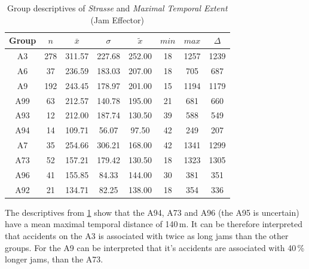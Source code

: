 \begin{table}[ht]
	\tiny
	\centering
	\begin{tabular}{c|c|c|c|c|c|c|c}
		\toprule
		Group & $n$ & $\bar{x}$ & $\sigma$ & $\tilde{x}$ & $min$ & $max$ & $\Delta$ \\
		\midrule
		A3   & 278 & 311.57 & 227.68 & 252.00 & 18 & 1257 & 1239 \\ 
		A6   & 37  & 236.59 & 183.03 & 207.00 & 18 & 705  & 687  \\ 
		A9   & 192 & 243.45 & 178.97 & 201.00 & 15 & 1194 & 1179 \\ 
		A99  & 63  & 212.57 & 140.78 & 195.00 & 21 & 681  & 660  \\ 
		A93  & 12  & 212.00 & 187.74 & 130.50 & 39 & 588  & 549  \\ 
		A94  & 14  & 109.71 & 56.07  & 97.50  & 42 & 249  & 207  \\ 
		A7   & 35  & 254.66 & 306.21 & 168.00 & 42 & 1341 & 1299 \\ 
		A73  & 52  & 157.21 & 179.42 & 130.50 & 18 & 1323 & 1305 \\ 
		A96  & 41  & 155.85 & 84.33  & 144.00 & 30 & 381  & 351  \\ 
		A92  & 21  & 134.71 & 82.25  & 138.00 & 18 & 354  & 336 \\ 
		\bottomrule
	  \end{tabular}
    \caption{Group descriptives of \textit{Strasse} and \textit{Maximal Temporal Extent} (Jam Effector)}
    \label{tbl:descriptives_baysis_effector_Strasse_TMax}
\end{table}
The descriptives from \cref{tbl:descriptives_baysis_effector_Strasse_TMax} show that the A94, A73 and A96 (the A95 is uncertain) have a mean maximal temporal distance of 140\,m. It can be therefore interpreted that accidents on the A3 is associated with twice as long jams than the other groups. For the A9 can be interpreted that it's accidents are associated with 40\,\% longer jams, than the A73.

